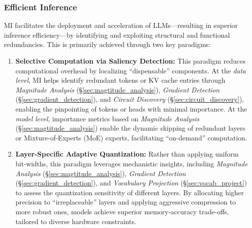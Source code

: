 \documentclass[11pt,letterpaper]{mystyle}
\begin{document}
\subsubsection{Efficient Inference}
\label{sec:efficient_inference}
\begin{tcolorbox}[takeawaysbox, title={Summary of Application Paradigms}]
  MI facilitates the deployment and acceleration of LLMs---resulting in superior inference efficiency---by identifying and exploiting structural and functional redundancies. This is primarily achieved through two key paradigms:
  \begin{enumerate}[leftmargin=*, label=\arabic*)]
      \item \textbf{Selective Computation via Saliency Detection:} 
      This paradigm reduces computational overhead by localizing ``dispensable'' components. 
      At the \textit{data level}, MI helps identify redundant tokens or KV cache entries through \textit{Magnitude Analysis} (\S\ref{sec:magtitude_analysis}), \textit{Gradient Detection} (\S\ref{sec:gradient_detection}), and \textit{Circuit Discovery} (\S\ref{sec:circuit_discovery}), enabling the pinpointing of tokens or heads with minimal importance.
      At the \textit{model level}, importance metrics based on \textit{Magnitude Analysis} (\S\ref{sec:magtitude_analysis}) enable the dynamic skipping of redundant layers or Mixture-of-Experts (MoE) experts, facilitating ``on-demand'' computation.
      \item \textbf{Layer-Specific Adaptive Quantization:} 
      Rather than applying uniform bit-widths, this paradigm leverages mechanistic insights, including \textit{Magnitude Analysis} (\S\ref{sec:magtitude_analysis}), \textit{Gradient Detection} (\S\ref{sec:gradient_detection}), and \textit{Vocabulary Projection} (\S\ref{sec:vocab_project}) to assess the quantization sensitivity of different layers. 
      By allocating higher precision to ``irreplaceable'' layers and applying aggressive compression to more robust ones, models achieve superior memory-accuracy trade-offs, tailored to diverse hardware constraints.
  \end{enumerate}
  \end{tcolorbox}
\end{document}
